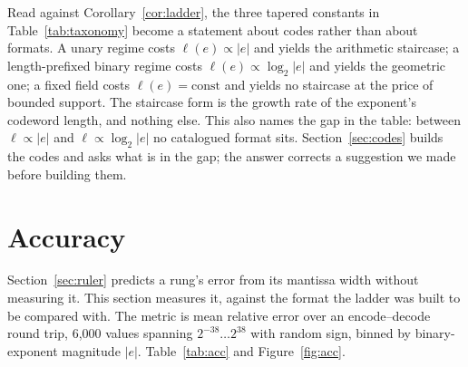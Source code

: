 Read against Corollary~\ref{cor:ladder}, the three tapered constants in
Table~\ref{tab:taxonomy} become a statement about codes rather than about
formats. A unary regime costs $\ell(e) \propto |e|$ and yields the arithmetic
staircase; a length-prefixed binary regime costs $\ell(e) \propto \log_2 |e|$ and
yields the geometric one; a fixed field costs $\ell(e) = \mathrm{const}$ and
yields no staircase at the price of bounded support. The staircase form is the
growth rate of the exponent's codeword length, and nothing else. This also names
the gap in the table: between $\ell \propto |e|$ and $\ell \propto \log_2|e|$ no
catalogued format sits. Section~\ref{sec:codes} builds the codes and asks what is
in the gap; the answer corrects a suggestion we made before building them.


\section{Accuracy}\label{sec:accuracy}



Section~\ref{sec:ruler} predicts a rung's error from its mantissa width without
measuring it. This section measures it, against the format the ladder was built
to be compared with. The metric is mean relative error over an encode--decode
round trip, 6{,}000 values spanning
$2^{-38}\ldots2^{38}$ with random sign, binned by binary-exponent magnitude
$|e|$. Table~\ref{tab:acc} and Figure~\ref{fig:acc}.

